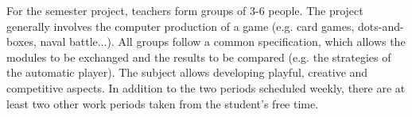 For the semester project, teachers form groups of 3-6 people. The project generally involves the computer production of a game (e.g. card games, dots-and-boxes, naval battle...). All groups follow a common specification, which allows the modules to be exchanged and the results to be compared (e.g. the strategies of the automatic player). The subject allows developing playful, creative and competitive aspects. In addition to the two periods scheduled weekly, there are at least two other work periods taken from the student's free time.